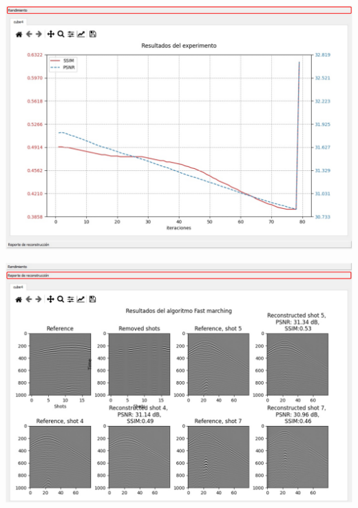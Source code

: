 \documentclass[12pt,twoside,letter]{ol-softwaremanual}
\newenvironment{Figure}
  {\par\medskip\noindent\minipage{\linewidth}}
  {\endminipage\par\medskip}
\begin{document}
\begin{enumerate}
	\begin{Figure}
		\centering
		\includegraphics[width=0.75\linewidth]{rendrd}
		\label{fig:result-comp1rd}
	\end{Figure}
	
	\begin{Figure}
		\centering
		\includegraphics[width=0.75\linewidth]{rendrd2}
		\label{fig:result-comp2rd}
	\end{Figure}
	
\end{enumerate}	
\end{document}
